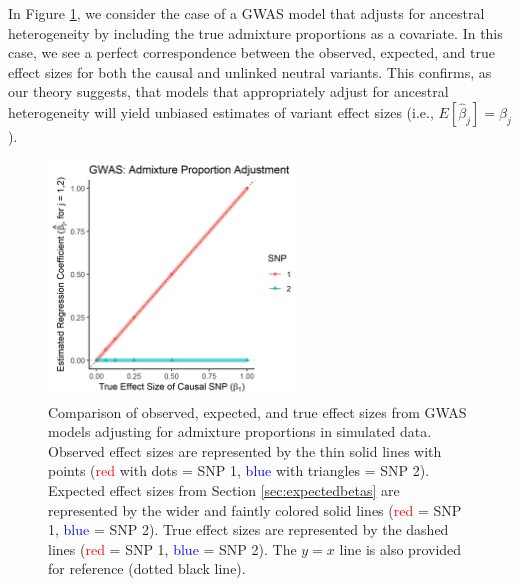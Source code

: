 \documentclass[12pt]{article}
\begin{document}
In Figure \ref{fig:pi}, we consider the case of a GWAS model that adjusts for ancestral heterogeneity by including the true admixture proportions as a covariate.
In this case, we see a perfect correspondence between the observed, expected, and true effect sizes for both the causal and unlinked neutral variants. 
This confirms, as our theory suggests, that models that appropriately adjust for ancestral heterogeneity will yield unbiased estimates of variant effect sizes (i.e., $E[\hat\beta_j] = \beta_j$).


\begin{figure}[!htb]
\centering
\includegraphics[width=0.6\textwidth]{figs/finalfigs/figS9_sims_pi}
\caption[Observed versus expected and true effect sizes from admixture proportion adjusted GWAS models.]%
{Comparison of observed, expected, and true effect sizes from GWAS models adjusting for admixture proportions in simulated data. 
Observed effect sizes  are represented by the thin solid lines with points (\textcolor{red}{red} with dots = SNP 1, \textcolor{blue}{blue} with triangles = SNP 2). 
Expected effect sizes  from Section \ref{sec:expectedbetas} are represented by the wider and faintly colored solid lines (\textcolor{red}{red} = SNP 1, \textcolor{blue}{blue} = SNP 2).
True effect sizes are represented by the dashed lines (\textcolor{red}{red} = SNP 1, \textcolor{blue}{blue} = SNP 2).
The $y = x$ line is also provided for reference (dotted black line).}
\label{fig:pi}
\end{figure}
\end{document}

